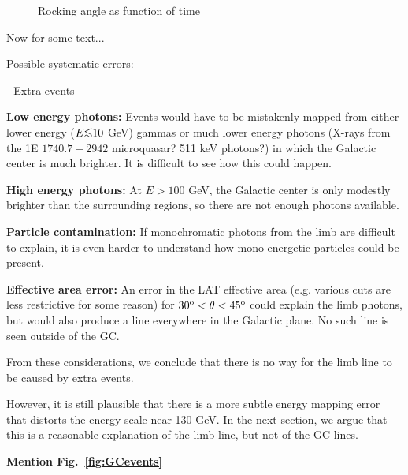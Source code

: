 \documentclass[aps,twocolumn,prd,superscriptaddress,showpacs,nofootinbib,fixfloat]{revtex4}
\newcommand{\degree}{^{\rm o}}
\def\la{\vcenter{\hbox{$<$}\offinterlineskip\hbox{$\sim$}}}
\begin{document}
\begin{figure}[p]
  \begin{center}
  \end{center}
  \caption{Rocking angle as function of time}
  \label{fig:rockTime}
\end{figure}

Now for some text...

Possible systematic errors:

- Extra events

{\bf Low energy photons:} Events would have to be mistakenly mapped from
either lower energy ($E \la 10$ GeV) gammas or much lower energy photons
(X-rays from the 1E $1740.7-2942$ microquasar?  511 keV photons?) in which the
Galactic center is much brighter.  It is difficult to see how this could
happen.

{\bf High energy photons:} At $E > 100$ GeV, the Galactic center is only
modestly brighter than the surrounding regions, so there are not enough
photons available.

{\bf Particle contamination:} If monochromatic photons from the limb are
difficult to explain, it is even harder to understand how mono-energetic
particles could be present. 

{\bf Effective area error:} An error in the LAT effective area (e.g. various
cuts are less restrictive for some reason) for $30\degree < \theta <
45\degree$ could explain the limb photons, but would also produce a line
everywhere in the Galactic plane.  No such line is seen outside of the GC. 

From these considerations, we conclude that there is no way for the limb line
to be caused by extra events. 

However, it is still plausible that there is a more subtle energy mapping
error that distorts the energy scale near 130 GeV.  In the next section, we
argue that this is a reasonable explanation of the limb line, but not of the
GC lines. 

\textbf{Mention Fig.~\ref{fig:GCevents}}
\end{document}
